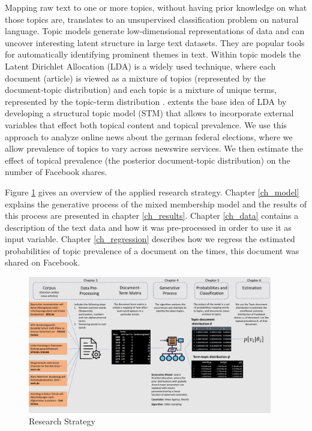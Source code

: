 \documentclass[12pt,a4paper,notitlepage]{article}
\begin{document}
Mapping raw text to one or more topics, without having prior knowledge on what those topics are, translates to an unsupervised classification problem on natural language. Topic models generate low-dimensional representations of data and can uncover interesting latent structure in large text datasets. They are popular tools for automatically identifying prominent themes in text. Within topic models the Latent Dirichlet Allocation (LDA) is a widely used technique, where each document (article) is viewed as a mixture of topics (represented by the document-topic distribution) and each topic is a mixture of unique terms, represented by the topic-term distribution \citep{blei_latent_2003}. \citet{roberts_model_2016} extents the base idea of LDA by developing a structural topic model (STM) that allows to incorporate external variables that effect both topical content and topical prevalence. We use this approach to analyze online news about the german federal elections, where we allow prevalence of topics to vary across newswire services. We then estimate the effect of topical prevalence (the posterior document-topic distribution) on the number of Facebook shares.

Figure \ref{fig_research_strat} gives an overview of the applied research strategy. Chapter \ref{ch_model} explains the generative process of the mixed membership model and the results of this process are presented in chapter \ref{ch_results}. Chapter \ref{ch_data} contains a description of the text data and how it was pre-processed in order to use it as input variable.  Chapter \ref{ch_regression} describes how we regress the estimated probabilities of topic prevalence of a document on the times, this document was shared on Facebook.

\begin{figure}[ht]
	\centering
	\includegraphics[width=0.95\textwidth]{../figs/research_strategy.pdf} 
	\caption{Research Strategy}
	\label{fig_research_strat}
\end{figure}
\end{document}
